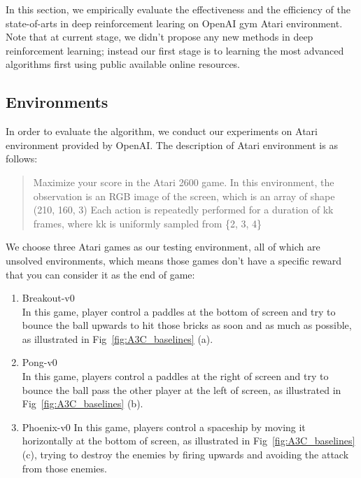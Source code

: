 

In this section, we empirically evaluate the effectiveness and the efficiency of the
state-of-arts in deep reinforcement learing on OpenAI gym Atari environment. Note 
that at current stage, we didn't propose any new methods in deep reinforcement learning;
instead our first stage is to learning the most advanced algorithms first using public
available online resources. 


\subsection{Environments}

In order to evaluate the algorithm, we conduct our experiments on Atari environment
provided by OpenAI. The description of Atari environment is as follows:
\begin{quote}
Maximize your score in the Atari 2600 game. In this
environment, the observation is an RGB image of the screen, which is an array
of shape (210, 160, 3) Each action is repeatedly performed for a duration of
kk frames, where kk is uniformly sampled from \{2, 3, 4\}~\cite{brockman2016openai}
\end{quote}

We choose three Atari games as our testing environment, all of which are unsolved environments, 
which means those games don't have a specific reward that you can consider it as the end of game:

\begin{enumerate}
\item Breakout-v0\\
In this game, player control a paddles at the bottom of screen and try to bounce the ball upwards
to hit those bricks as soon and as much as possible, as illustrated in Fig~\ref{fig:A3C_baselines} (a). 

\item Pong-v0\\
In this game, players control a paddles at the right of screen and try to bounce the ball pass the
other player at the left of screen, as illustrated in Fig~\ref{fig:A3C_baselines} (b). 

\item Phoenix-v0
In this game, players control a spaceship by moving it horizontally at the bottom of screen, as 
illustrated in Fig~\ref{fig:A3C_baselines} (c), trying to destroy the enemies by firing upwards 
and avoiding the attack from those enemies. 
\end{enumerate}

